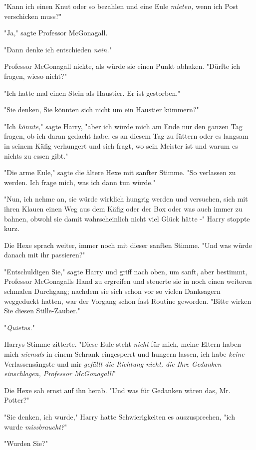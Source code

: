 {"Kann ich einen Knut oder so bezahlen und eine Eule \emph{mieten,} wenn ich Post verschicken muss?"

"Ja," sagte Professor McGonagall.

"Dann denke ich entschieden \emph{nein.}"

Professor McGonagall nickte, als würde sie einen Punkt abhaken. "Dürfte ich fragen, wieso nicht?"

"Ich hatte mal einen Stein als Haustier. Er ist gestorben."

"Sie denken, Sie könnten sich nicht um ein Haustier kümmern?"

"Ich \emph{könnte,}" sagte Harry, "aber ich würde mich am Ende nur den ganzen Tag fragen, ob ich daran gedacht habe, es an diesem Tag zu füttern oder es langsam in seinem Käfig verhungert und sich fragt, wo sein Meister ist und warum es nichts zu essen gibt."

"Die arme Eule," sagte die ältere Hexe mit sanfter Stimme. "So verlassen zu werden. Ich frage mich, was ich dann tun würde."

"Nun, ich nehme an, sie würde wirklich hungrig werden und versuchen, sich mit ihren Klauen einen Weg aus dem Käfig oder der Box oder was auch immer zu bahnen, obwohl sie damit wahrscheinlich nicht viel Glück hätte -" Harry stoppte kurz.

Die Hexe sprach weiter, immer noch mit dieser sanften Stimme. "Und was würde danach mit ihr passieren?"

"Entschuldigen Sie," sagte Harry und griff nach oben, um sanft, aber bestimmt, Professor McGonagalls Hand zu ergreifen und steuerte sie in noch einen weiteren schmalen Durchgang; nachdem sie sich schon vor so vielen Danksagern weggeduckt hatten, war der Vorgang schon fast Routine geworden. "Bitte wirken Sie diesen Stille-Zauber."

"\emph{Quietus.}"

Harrys Stimme zitterte. "Diese Eule steht \emph{nicht} für mich, meine Eltern haben mich \emph{niemals} in einem Schrank eingesperrt und hungern lassen, ich habe \emph{keine} Verlassensängste und mir \emph{gefällt die Richtung nicht, die Ihre Gedanken einschlagen, Professor McGonagall!}"

Die Hexe sah ernst auf ihn herab. "Und was für Gedanken wären das, Mr. Potter?"

"Sie denken, ich wurde," Harry hatte Schwierigkeiten es auszusprechen, "ich wurde \emph{missbraucht?}"

"Wurden Sie?"

}

